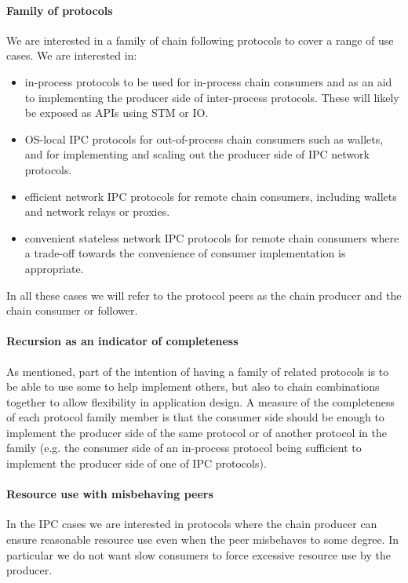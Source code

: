 \documentclass{article}
\theoremstyle{definition}{
  \newtheorem{lemma}{Lemma}[section] %
  \newtheorem{definition}[lemma]{Definition}
}
\theoremstyle{theorem}{
  \newtheorem{invariant}[lemma]{Invariant}
  \newtheorem{proofobligation}[lemma]{Proof Obligation}
}
\numberwithin{equation}{lemma}
\begin{document}
\paragraph{Family of protocols}
We are interested in a family of chain following protocols to cover a range of
use cases. We are interested in:
\begin{itemize}
\item in-process protocols to be used for in-process chain consumers and as an
      aid to implementing the producer side of inter-process protocols.
      These will likely be exposed as APIs using STM or IO.
\item OS-local IPC protocols for out-of-process chain consumers
      such as wallets, and for implementing and scaling out the producer side
      of IPC network protocols.
\item efficient network IPC protocols for remote chain consumers, including
      wallets and network relays or proxies.
\item convenient stateless network IPC protocols for remote chain consumers
      where a trade-off towards the convenience of consumer implementation is
      appropriate.
\end{itemize}

In all these cases we will refer to the protocol peers as the chain producer
and the chain consumer or follower.

\paragraph{Recursion as an indicator of completeness} As mentioned, part of the
intention of having a family of related protocols is to be able to use some to
help implement others, but also to chain combinations together to allow
flexibility in application design. A measure of the completeness of each
protocol family member is that the consumer side should be enough to implement
the producer side of the same protocol or of another protocol in the family
(e.g. the consumer side of an in-process protocol being sufficient to implement
the producer side of one of IPC protocols).

\paragraph{Resource use with misbehaving peers}
In the IPC cases we are interested in protocols where the chain producer can
ensure reasonable resource use even when the peer misbehaves to some degree. In
particular we do not want slow consumers to force excessive resource use by the
producer.
\end{document}

